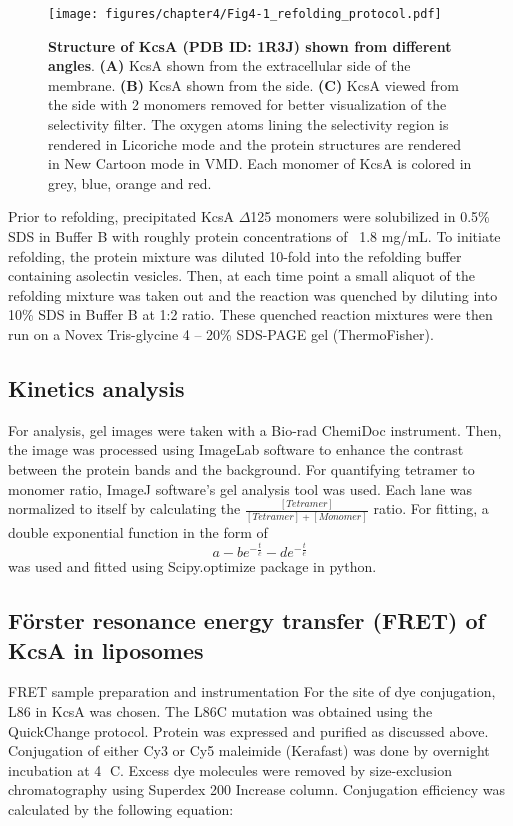 \begin{figure}[!ht]
\begin{center}
	\texttt{[image: figures/chapter4/Fig4-1\_refolding\_protocol.pdf]}
\end{center}
	\caption{\textbf{Structure of KcsA (PDB ID: 1R3J) shown from different angles}. \textbf{(A)} KcsA shown from the extracellular side of the membrane. \textbf{(B)} KcsA shown from the side. \textbf{(C)} KcsA viewed from the side with 2 monomers removed for better visualization of the selectivity filter. The oxygen atoms lining the selectivity region is rendered in Licoriche mode and the protein structures are rendered in New Cartoon mode in VMD. Each monomer of KcsA is colored in grey, blue, orange and red.}
	\label{fig:ch4_f1}
\end{figure}

Prior to refolding, precipitated KcsA $\Delta$125 monomers were solubilized in 0.5\% SDS in Buffer B with roughly protein concentrations of ~1.8 mg/mL. To initiate refolding, the protein mixture was diluted 10-fold into the refolding buffer containing asolectin vesicles. Then, at each time point a small aliquot of the refolding mixture was taken out and the reaction was quenched by diluting into 10\% SDS in Buffer B at 1:2 ratio. These quenched reaction mixtures were then run on a Novex Tris-glycine 4 – 20\% SDS-PAGE gel (ThermoFisher).

\subsection{Kinetics analysis}
	For analysis, gel images were taken with a Bio-rad ChemiDoc instrument. Then, the image was processed using ImageLab software to enhance the contrast between the protein bands and the background. For quantifying tetramer to monomer ratio, ImageJ software’s gel analysis tool was used. Each lane was normalized to itself by calculating the $\frac{[Tetramer]}{[Tetramer]+[Monomer]}$ ratio. For fitting, a double exponential function in the form of
	\begin{equation} a-be^{-\frac{t}{c}}-de^{-\frac{t}{e}} \end{equation}
was used and fitted using Scipy.optimize package in python.

\subsection{F\"{o}rster resonance energy transfer (FRET) of KcsA in liposomes}
FRET sample preparation and instrumentation
For the site of dye conjugation, L86 in KcsA was chosen. The L86C mutation was obtained using the QuickChange protocol. Protein was expressed and purified as discussed above. Conjugation of either Cy3 or Cy5 maleimide (Kerafast) was done by overnight incubation at 4 C. Excess dye molecules were removed by size-exclusion chromatography using Superdex 200 Increase column. Conjugation efficiency was calculated by the following equation:

